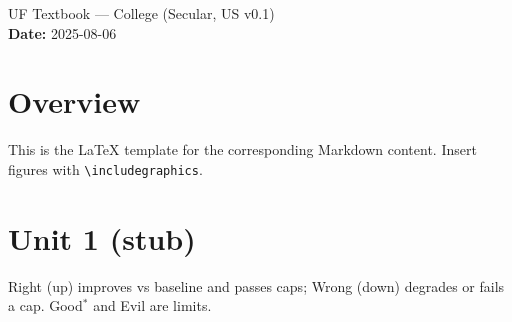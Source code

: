 \documentclass[11pt]{article}
\begin{document}
\begin{center}
{\LARGE UF Textbook — College (Secular, US v0.1) }\\[6pt]
\textbf{Date: }2025-08-06
\end{center}

\section*{Overview}
This is the LaTeX template for the corresponding Markdown content. Insert figures with \texttt{\textbackslash includegraphics}.

\section*{Unit 1 (stub)}
Right (up) improves vs baseline and passes caps; Wrong (down) degrades or fails a cap. Good$^\ast$ and Evil are limits.
\end{document}
